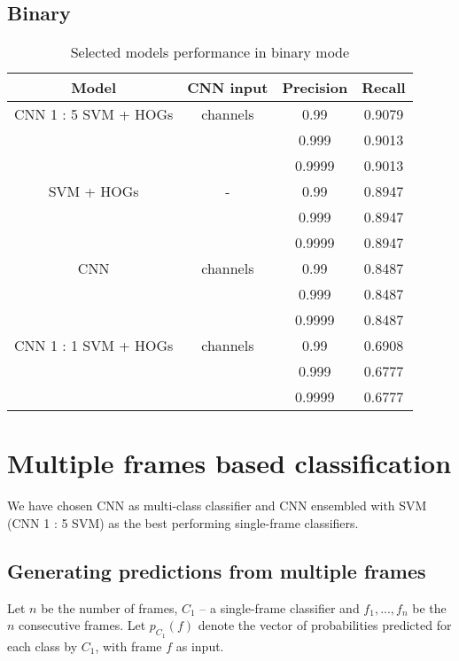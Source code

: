         \subsection{Binary}
        \begin{table}[H]
        \begin{center}
        \small
        \caption{Selected models performance in binary mode}
        \begin{tabular}{ |c|c|c|c| }
            \hline
            Model & CNN input & Precision & Recall\\
        \hline
        CNN 1 : 5 SVM + HOGs & channels & 0.99 & 0.9079\\
        & & 0.999 & 0.9013\\
        & & 0.9999 & 0.9013\\
        \hline
        SVM + HOGs & - & 0.99 & 0.8947 \\
        & & 0.999 & 0.8947\\
        & & 0.9999 & 0.8947\\
        \hline
        CNN & channels & 0.99 & 0.8487 \\
        & & 0.999 & 0.8487\\
        & & 0.9999 & 0.8487\\
        \hline
        CNN 1 : 1 SVM + HOGs & channels & 0.99 & 0.6908\\
        & & 0.999 & 0.6777\\
        & & 0.9999 & 0.6777\\
        \hline

        \end{tabular}
        \end{center}
        \end{table}

    \section{Multiple frames based classification}
    We have chosen CNN as multi-class classifier and CNN ensembled with SVM (CNN 1 : 5 SVM) as
    the best performing single-frame classifiers.

    \subsection{Generating predictions from multiple frames}
    Let $n$ be the number of frames, $C_{1}$ -- a single-frame classifier and
    $f_1, ..., f_n$ be the $n$ consecutive frames.
    Let $p_{C_{1}}(f)$ denote the vector of probabilities predicted for each class by $C_{1}$,
    with frame $f$ as input.

